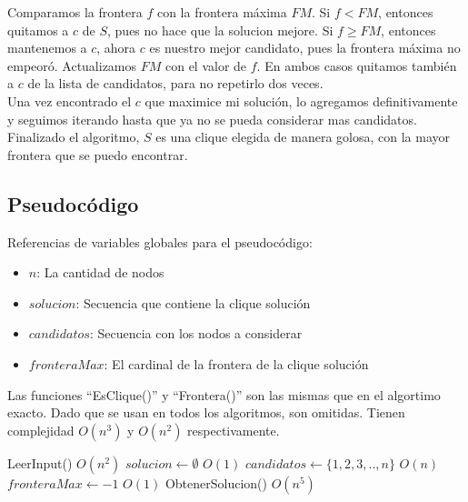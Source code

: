 Comparamos la frontera $f$ con la frontera máxima $FM$. Si $f < FM$, entonces quitamos a $c$ de $S$, pues no hace que la solucion mejore. Si $f \geq FM$, entonces mantenemos a $c$, ahora $c$ es nuestro mejor candidato, pues la frontera máxima no empeoró. Actualizamos $FM$ con el valor de $f$. En ambos casos quitamos también a $c$ de la lista de candidatos, para no repetirlo dos veces. \\

Una vez encontrado el $c$ que maximice mi solución, lo agregamos definitivamente y seguimos iterando hasta que ya no se pueda considerar mas candidatos. \\

Finalizado el algoritmo, $S$ es una clique elegida de manera golosa, con la mayor frontera que se puedo encontrar. \\


\subsection{Pseudocódigo}

Referencias de variables globales para el pseudocódigo:
\begin{itemize}
    \item $n$: La cantidad de nodos
    \item $solucion$: Secuencia que contiene la clique solución
    \item $candidatos$: Secuencia con los nodos a considerar
    \item $fronteraMax$: El cardinal de la frontera de la clique solución
\end{itemize}

Las funciones ``EsClique()'' y ``Frontera()'' son las mismas que en el algortimo exacto. Dado que se usan en todos los algoritmos, son omitidas. Tienen complejidad $O(n^3)$ y $O(n^2)$ respectivamente.

\begin{algorithm}[H]
\begin{algorithmic}
    \State LeerInput()                              \Comment $O(n^2)$
    \State $solucion \gets \emptyset$               \Comment $O(1)$
    \State $candidatos \gets \{1, 2, 3, .. , n\} $  \Comment $O(n)$
    \State $fronteraMax \gets -1$                   \Comment $O(1)$
    \State ObtenerSolucion()                        \Comment $O(n^5)$
\EndFunction
\end{algorithmic}
\end{algorithm}



